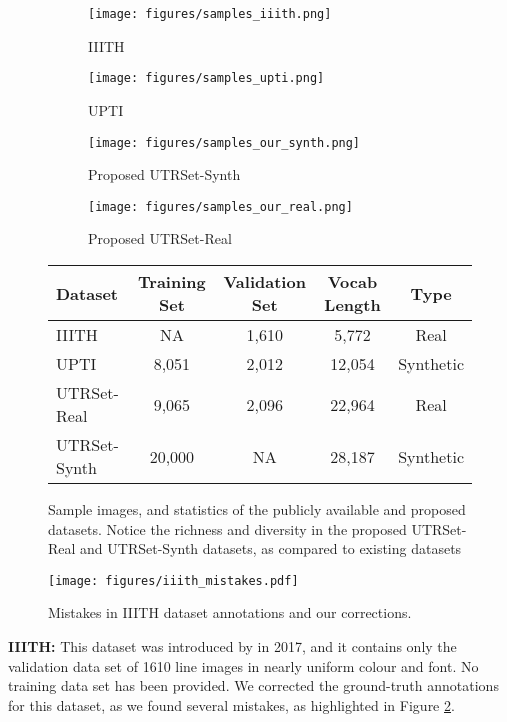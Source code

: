 \documentclass[runningheads]{llncs}
\newcommand{\DatasetNameReal}{{UTRSet-Real}\xspace}
\newcommand{\DatasetNameSynth}{{UTRSet-Synth}\xspace}
\newcommand{\mypara}[1]{\vspace{0.5em} \noindent \textbf{#1:}}
\begin{document}
\begin{figure}[t]
	\begin{subfigure}[b]{0.5\linewidth}
		\centering
		\texttt{[image: figures/samples\_iiith.png]}
		\caption{IIITH \cite{iiith17urdu}}
	\end{subfigure}
\begin{subfigure}[b]{0.5\linewidth}
	\centering
	\texttt{[image: figures/samples\_upti.png]}
	\caption{UPTI \cite{upti_paper}}
	\end{subfigure}
\begin{subfigure}[b]{1.0\linewidth}
	\centering
	\texttt{[image: figures/samples\_our\_synth.png]}
	\caption{Proposed \DatasetNameSynth}
	\end{subfigure}
\begin{subfigure}[b]{1.0\linewidth}
	\centering
	\texttt{[image: figures/samples\_our\_real.png]}
	\caption{Proposed \DatasetNameReal}
	\end{subfigure}
\setlength{\tabcolsep}{6pt}
	\begin{tabular}{lcccc}
	\\
	\toprule[1.5pt]
	\textbf{Dataset} & \textbf{Training Set} & \textbf{Validation Set} & \textbf{Vocab Length} & \textbf{Type}\\ [0.5ex]
	\midrule[0.5pt]
	IIITH \cite{iiith17urdu} & NA & 1,610 & 5,772 & Real \\
	UPTI \cite{upti_paper} & 8,051 & 2,012 & 12,054 & Synthetic \\[0.5ex]
	\DatasetNameReal & 9,065 & 2,096 & 22,964 & Real \\
	\DatasetNameSynth & 20,000 & NA & 28,187 & Synthetic \\
	\bottomrule[1.5pt]
	\end{tabular}
	\caption{Sample images, and statistics of the publicly available and proposed datasets. Notice the richness and diversity in the proposed \DatasetNameReal and \DatasetNameSynth datasets, as compared to existing datasets}
	\label{fig:datasets_samples_and_stats}
	\vspace{-1em}
\end{figure}

\begin{figure}[t]
	\texttt{[image: figures/iiith\_mistakes.pdf]}
	\caption{Mistakes in IIITH dataset annotations and our corrections.}
        \label{fig:iiith_mistakes}
\end{figure}

\mypara{IIITH}
This dataset was introduced by \cite{iiith17urdu} in 2017, and it contains only the validation data set of 1610 line images in nearly uniform colour and font. No training data set has been provided. We corrected the ground-truth annotations for this dataset, as we found several mistakes, as highlighted in Figure \ref{fig:iiith_mistakes}.
\end{document}
